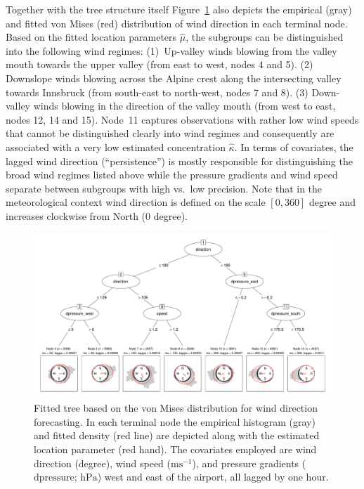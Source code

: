 \documentclass[nojss]{jss}
\numberwithin{equation}{section}
\begin{document}
Together with the tree structure itself Figure~\ref{fig:tree_ibk} also depicts the empirical (gray) 
and fitted von Mises (red) distribution of wind direction in each terminal node. Based on the 
fitted location parameters $\hat \mu$, the subgroups can be distinguished into the following 
wind regimes:
(1)~Up-valley winds blowing from the valley mouth towards the upper valley (from
east to west, nodes 4 and 5). 
(2) Downslope winds blowing across the Alpine crest along the intersecting valley towards 
Innsbruck (from south-east to north-west, nodes 7 and 8). 
(3) Down-valley winds blowing in the direction of the valley mouth (from west to east, 
nodes 12, 14 and 15). 
Node~11 captures observations with rather low wind speeds that cannot be distinguished
clearly into wind regimes and consequently are associated with a very low
estimated concentration $\hat \kappa$. In terms of covariates, the lagged
wind direction (``persistence'') is mostly responsible for distinguishing
the broad wind regimes listed above while the pressure gradients and wind
speed separate between subgroups with high vs.\ low precision.
Note that in the meteorological context wind direction is defined on the scale $[0,360]$ degree and 
increases clockwise from North ($0$ degree).

\begin{figure}[t]
\centering
\includegraphics[width = \textwidth]{_plot_circforest_finalexampletree_ibk_lag1_v14.pdf}
\caption{Fitted tree based on the von Mises distribution for wind direction forecasting.
In each terminal node the empirical histogram (gray) and fitted density (red line)
are depicted along with the estimated location parameter (red hand). The covariates
employed are wind direction (degree), wind speed ($\text{ms}^{-1}$),
and pressure gradients ($\text{dpressure; hPa}$) west and east of the airport,
all lagged by one hour.}
\label{fig:tree_ibk} 
\end{figure}
\end{document}

